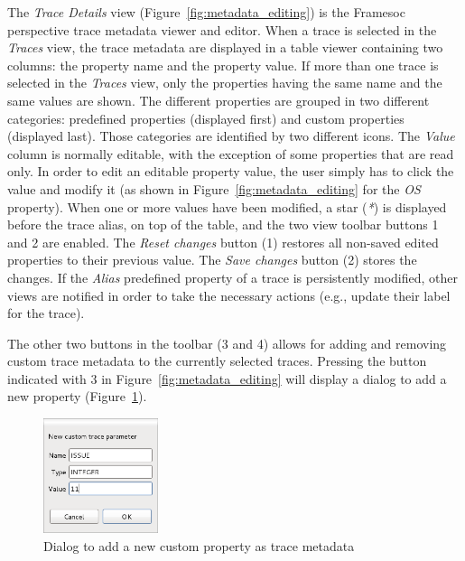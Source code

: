 \documentclass[twoside]{article}
\begin{document}
\begin{sloppypar}
The \emph{Trace Details} view (Figure~\ref{fig:metadata_editing}) is the Framesoc perspective trace metadata viewer and editor.
When a trace is selected in the \emph{Traces} view, the trace metadata are displayed in a table viewer containing two columns: the property name and the property value.
If more than one trace is selected in the \emph{Traces} view, only the properties having the same name and the same values are shown.
The different properties are grouped in two different categories: predefined properties (displayed first) and custom properties (displayed last). 
Those categories are identified by two different icons.
The \emph{Value} column is normally editable, with the exception of some properties that are read only.
In order to edit an editable property value, the user simply has to click the value and modify it (as shown in Figure~\ref{fig:metadata_editing} for the \emph{OS} property).
When one or more values have been modified, a star (\emph{*}) is displayed before the trace alias, on top of the table, and the two view toolbar buttons \num{1} and \num{2} are enabled. 
The \emph{Reset changes} button (\num{1}) restores all non-saved edited properties to their previous value.
The \emph{Save changes} button (\num{2}) stores the changes.
If the \emph{Alias} predefined property of a trace is persistently modified, other views are notified in order to take the necessary actions (e.g., update their label for the trace).

The other two buttons in the toolbar (\num{3} and \num{4}) allows for adding and removing custom trace metadata to the currently selected traces. Pressing the button indicated with \num{3} in Figure~\ref{fig:metadata_editing} will display a dialog to add a new property (Figure~\ref{fig:new_metadata}).

\begin{figure}[h!]
  \centering
    \includegraphics[width=0.3\textwidth]{images/new_metadata.png}
  \caption{Dialog to add a new custom property as trace metadata}
  \label{fig:new_metadata}
\end{figure}


\end{sloppypar}
\end{document}
